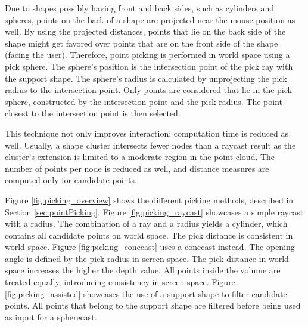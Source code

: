 Due to shapes possibly having front and back sides, such as cylinders and spheres, points on the back of a shape are projected near the mouse position as well. By using the projected distances, points that lie on the back side of the shape might get favored over points that are on the front side of the shape (facing the user). Therefore, point picking is performed in world space using a pick sphere. The sphere's position is the intersection point of the pick ray with the support shape. The sphere's radius is calculated by unprojecting the pick radius to the intersection point. Only points are considered that lie in the pick sphere, constructed by the intersection point and the pick radius. The point closest to the intersection point is then selected. 

\par

This technique not only improves interaction; computation time is reduced as well. Usually, a shape cluster intersects fewer nodes than a raycast result as the cluster's extension is limited to a moderate region in the point cloud. The number of points per node is reduced as well, and distance measures are computed only for candidate points. 

\par

Figure \ref{fig:picking_overview} shows the different picking methods, described in Section \ref{sec:pointPicking}. Figure \ref{fig:picking_raycast} showcases a simple raycast with a radius. The combination of a ray and a radius yields a cylinder, which contains all candidate points on world space. The pick distance is consistent in world space. Figure \ref{fig:picking_conecast} uses a conecast instead. The opening angle is defined by the pick radius in screen space. The pick distance in world space increases the higher the depth value. All points inside the volume are treated equally, introducing consistency in screen space. Figure \ref{fig:picking_assisted} showcases the use of a support shape to filter candidate points. All points that belong to the support shape are filtered before being used as input for a spherecast. 

